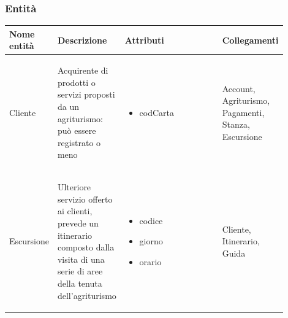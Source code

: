 \documentclass[12pt,a4paper]{article}
\begin{document}
\subsubsection{Entità}
\label{Soggiorno Entita}
\begin{center}
\setlength{\extrarowheight}{1.5pt}
\begin{longtable}{|p{0.14\linewidth}|p{0.20\linewidth}|p{0.36\linewidth}|p{0.20\linewidth}|}
\hline 
\textbf{Nome entità} 	& \textbf{Descrizione} & \textbf{Attributi} & \textbf{Collegamenti}\\ 

\hline

    
\hline
Cliente				 	& \begin{flushleft}\vspace{-15pt} Acquirente di prodotti o servizi proposti da un agriturismo: può essere registrato o meno \end{flushleft}
					& \begin{itemize}
						\setlength{\itemindent}{-1em}
						\vspace{-25pt}
						\setlength\itemsep{-0.25em}
						\item codCarta
					\end{itemize}
					& \begin{flushleft}\vspace{-25pt} Account, Agriturismo, Pagamenti, Stanza, Escursione \end{flushleft} \\ 

\hline
Escursione				 	& \begin{flushleft}\vspace{-25pt} Ulteriore servizio offerto ai clienti, prevede un itinerario composto dalla visita di una serie di aree della tenuta dell'agriturismo \end{flushleft}
					& \begin{itemize}
						\setlength{\itemindent}{-1em}
						\vspace{-25pt}
						\setlength\itemsep{-0.25em}
						\item codice
						\item giorno
						\item orario
						
					\end{itemize}
					& \begin{flushleft}\vspace{-25pt} Cliente, Itinerario, Guida \end{flushleft} \\ 


\end{longtable}
\end{center}
\end{document}
